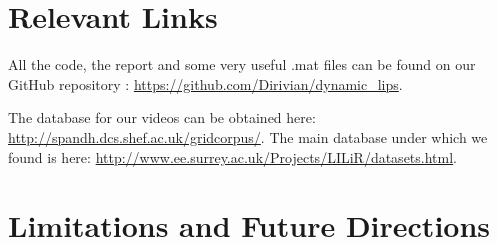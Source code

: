 \documentclass[a4paper]{article}
\begin{document}
\section{Relevant Links }

All the code, the report and some very useful .mat files can be found on our GitHub repository  : \url{https://github.com/Dirivian/dynamic_lips}.

The database for our videos can be obtained here: \url{http://spandh.dcs.shef.ac.uk/gridcorpus/}. The main database under which we found is here: \url{http://www.ee.surrey.ac.uk/Projects/LILiR/datasets.html}.
 

\section{Limitations and Future Directions}
\end{document}
